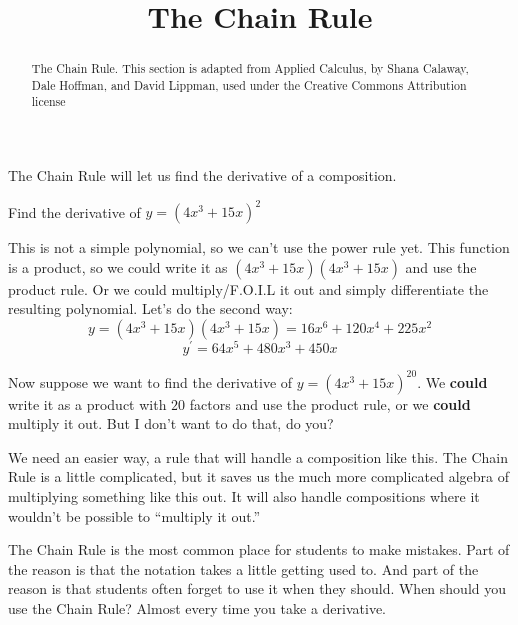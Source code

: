 \documentclass{ximera}
\title[Dig-In:]{The Chain Rule}
\begin{document}
\begin{abstract}
The Chain Rule.  This section is adapted from Applied Calculus, by Shana Calaway, Dale Hoffman, and David Lippman, used under the Creative Commons Attribution license
\end{abstract}
\maketitle

The  Chain  Rule  will  let  us  find  the  derivative  of  a  composition.  
\begin{example}
Find the derivative of $y=(4x^3+15x)^2$

This is not a simple polynomial, so we can’t use the power rule yet.  This function is a product, so we could write it as $(4x^3+15x)(4x^3+15x)$ and use the product rule.  Or we could multiply/F.O.I.L it out and simply differentiate the resulting polynomial.  Let's do the second way:
 \[ 
y=(4x^3+15x)(4x^3+15x) =16x^6+120x^4+225x^2 
\]
\[
y^{\prime}=64x^5+480x^3+450x
\]
\end{example}
Now suppose we want to find the derivative of $y=(4x^3+15x)^{20}$.  We \textbf{could} write it as a product with $20$ factors and use the product rule, or we \textbf{could} multiply it out.  But I don't want to do that, do you?

We need an easier way, a rule that will handle a composition like this.  The Chain Rule is a little complicated, but it saves us the much more complicated algebra of multiplying something like this out.  It will also handle compositions where it wouldn't be possible to ``multiply it out.''

The Chain Rule is the most common place for students to make mistakes.  Part of the reason is that the notation takes a little getting used to.  And part of the reason is that students often forget to use it when they should.  When should you use the Chain Rule?  Almost every time you take a derivative.
\end{document}

